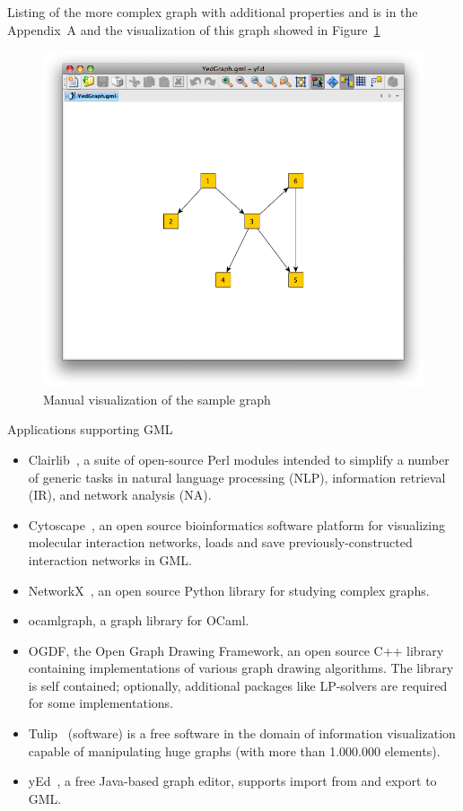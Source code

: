 Listing of the more complex graph with additional properties and is in the Appendix~A and the visualization of this graph showed in Figure~\ref{fig:yed_graph_vis}

\begin{figure}[h!]
\centering
\includegraphics[scale=0.5]{pictures/YedGraph.png}
\caption{Manual visualization of the sample graph}
\label{fig:yed_graph_vis}
\end{figure}

Applications supporting GML~\cite{GML_wiki}

\begin{itemize}
\item Clairlib~\cite{clairlib}, a suite of open-source Perl modules intended to simplify a number of generic tasks in natural language processing (NLP), information retrieval (IR), and network analysis (NA).
\item Cytoscape~\cite{Cytoscape}, an open source bioinformatics software platform for visualizing molecular interaction networks, loads and save previously-constructed interaction networks in GML.
\item NetworkX~\cite{NetworkX}, an open source Python library for studying complex graphs.
\item ocamlgraph\cite{ocamlgraph}, a graph library for OCaml.
\item OGDF\cite{OGDF}, the Open Graph Drawing Framework, an open source C++ library containing implementations of various graph drawing algorithms. The library is self contained; optionally, additional packages like LP-solvers are required for some implementations.
\item Tulip~\cite{Tulip} (software) is a free software in the domain of information visualization capable of manipulating huge graphs (with more than 1.000.000 elements).
\item yEd~\cite{yed}, a free Java-based graph editor, supports import from and export to GML.
\end{itemize}


